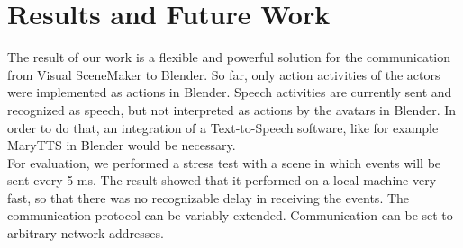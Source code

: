 \documentclass[
10pt, %
a4paper, %
oneside,
headinclude,footinclude, %
BCOR5mm, %
]{scrartcl}
\begin{document}

\section{Results and Future Work}
The result of our work is a flexible and powerful solution for the communication from Visual SceneMaker to Blender. So far, only action activities of the actors were implemented as actions in Blender. Speech activities are currently sent and recognized as speech, but not interpreted as actions by the avatars in Blender. In order to do that, an integration of a Text-to-Speech software, like for example MaryTTS in Blender would be necessary. \\
For evaluation, we performed a stress test with a scene in which events will be sent every 5 ms. The result showed that it performed on a local machine very fast, so that there was no recognizable delay in receiving the events. The communication protocol can be variably extended. Communication can be set to arbitrary network addresses.
\end{document}

